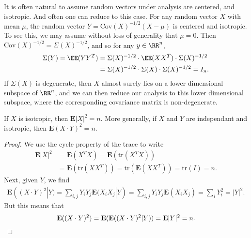 It is often natural to assume random vectors under analysis are centered, and isotropic. And often one can reduce to this case. For any random vector $X$ with mean $\mu$, the random vector $Y = \text{Cov}(X)^{-1/2}(X - \mu)$ is centered and isotropic. To see this, we may assume without loss of generality that $\mu = 0$. Then $\text{Cov}(X)^{-1/2} = \Sigma(X)^{-1/2}$, and so for any $y \in \RR^n$,
%
\begin{align*}
	\Sigma(Y) = \EE(Y Y^T) &= \Sigma(X)^{-1/2} \cdot \EE(X X^T) \cdot \Sigma(X)^{-1/2}\\
	&= \Sigma(X)^{-1/2} \cdot \Sigma(X) \cdot \Sigma(X)^{-1/2} = I_n.
\end{align*}
%
If $\Sigma(X)$ is degenerate, then $X$ almost surely lies on a lower dimensional subspace of $\RR^n$, and we can then reduce our analysis to this lower dimensional subspace, where the corresponding covariance matrix is non-degenerate.

%
%

\begin{lemma} \label{isotropyinnerproductlemma}
    If $X$ is isotropic, then $\mathbf{E} |X|^2 = n$. More generally, if $X$ and $Y$ are independant and isotropic, then $\mathbf{E}(X \cdot Y)^2 = n$.
\end{lemma}
\begin{proof}
    We use the cycle property of the trace to write
    \begin{align*}
        \mathbf{E} |X|^2 &= \mathbf{E} (X^T X) = \mathbf{E} \left( \text{tr}(X^T X) \right)\\
        &= \mathbf{E} \left( \text{tr}(XX^T) \right) = \text{tr}(\mathbf{E}(XX^T)) = \text{tr}(I) = n.
    \end{align*}
    Next, given $Y$, we find
    \begin{align*}
        \mathbf{E}((X \cdot Y)^2 | Y) = \sum_{i,j} Y_iY_j \mathbf{E}(X_iX_j|Y) = \sum_{i,j} Y_iY_j \mathbf{E}(X_iX_j) = \sum_i Y_i^2 = |Y|^2.
    \end{align*}
    But this means that
    \[ \mathbf{E}((X \cdot Y)^2) = \mathbf{E}(\mathbf{E}((X \cdot Y)^2 | Y)) = \mathbf{E} |Y|^2 = n. \qedhere \]
\end{proof}


